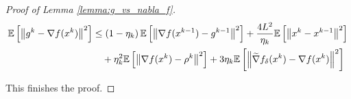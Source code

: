 \begin{proof}[Proof of Lemma \ref{lemma:g_vs_nabla_f}]
        \begin{equation*}
        \begin{split}
            \mathbb{E}\left[ \left\| g^k - \nabla f(x^k) \right\|^2 \right]
            &\leq 
            \left(1 - \eta_k\right) \mathbb{E}\left[ \left\| \nabla f(x^{k-1}) - g^{k-1} \right\|^2 \right]
            +
            \frac{4 L^2}{\eta_k} \mathbb{E}\left[ \left\| x^k - x^{k-1} \right\|^2 \right]
            \\&\quad+
            \eta_k^2 \mathbb{E}\left[ \left\| \nabla f(x^k) - \rho^k \right\|^2 \right]
            +
            3 \eta_k \mathbb{E}\left[ \left\| \widetilde{\nabla} f_\delta(x^k) - \nabla f(x^k) \right\|^2 \right]
        \end{split}
        \end{equation*}

        This finishes the proof.
    
    \end{proof}

